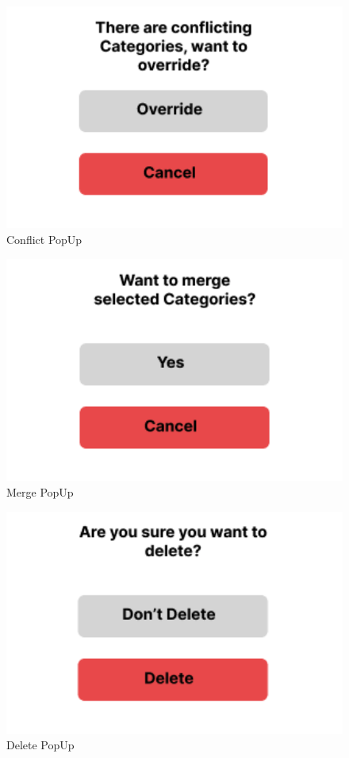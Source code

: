 \documentclass[parskip=full]{scrartcl} %
\begin{document}
\begin{figure}
    \centering
    \includegraphics[width=1\textwidth]{pictures/Conflict PopUp.png}
    \caption{Conflict PopUp}
\end{figure}

\begin{figure}
    \centering
    \includegraphics[width=1\textwidth]{pictures/Merge PopUp.png}
    \caption{Merge PopUp}
\end{figure}

\begin{figure}
    \centering
    \includegraphics[width=1\textwidth]{pictures/Delete PopUp.png}
    \caption{Delete PopUp}
\end{figure}
\end{document}
